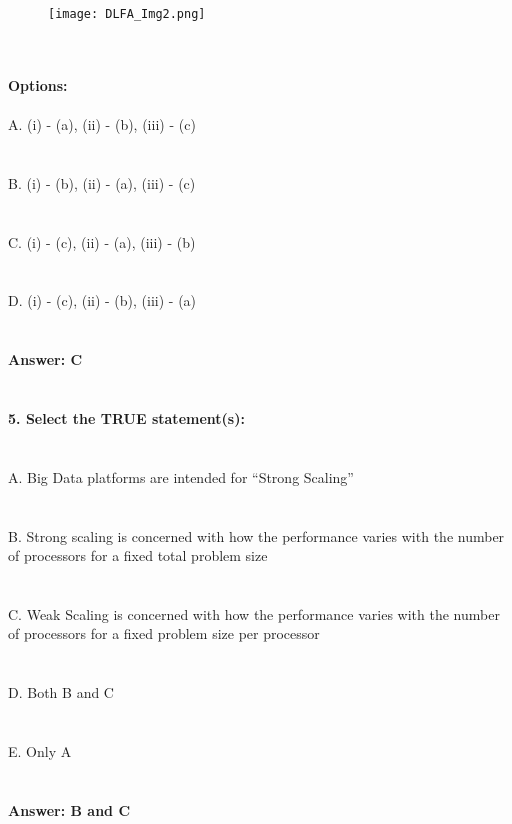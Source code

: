 \documentclass[prl,twocolumn,showpacs,preprintnumbers,superscriptaddress]{revtex4}
\theoremstyle{plain}
\theoremstyle{definition}
\begin{document}
\begin{widetext}
{}
\begin{figure}[H]
\begin{center}
        \texttt{[image: DLFA\_Img2.png]}
\end{center}
\end{figure}
\\
\\
\noindent\textbf{Options:}
\\
\\
\noindent A. (i) - (a), (ii) - (b), (iii) - (c)
\\
\\
\\
B. (i) - (b), (ii) - (a), (iii) - (c)
\\
\\
\\
C. (i) - (c), (ii) - (a), (iii) - (b)
\\
\\
\\
D. (i) - (c), (ii) - (b), (iii) - (a)
\\
\\
\\
\textbf{Answer: C}
\\
\\
\\
\textbf{5. Select the TRUE statement(s):}
\\
\\
\\
\noindent A. Big Data platforms are intended for “Strong Scaling”
\\
\\
\\
B. Strong scaling is concerned with how the performance varies with the number of processors for a fixed total problem size
\\
\\
\\
C. Weak Scaling is concerned with how the performance varies with the number of processors for a fixed problem size per processor
\\
\\
\\
D. Both B and C
\\
\\
\\
E. Only A
\\
\\
\\
\textbf{Answer: B and C}
\\
\\
\\

\end{widetext}
\end{document}
